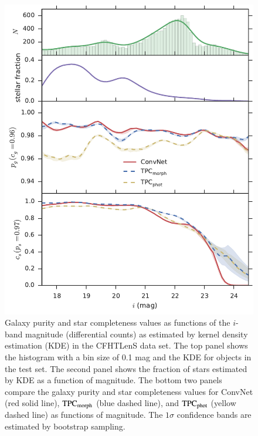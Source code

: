 \documentclass[fleqn,usenatbib]{mnras}
\begin{document}
\begin{figure}
  \centering
  \includegraphics[width=\columnwidth]{figures/clens_mag.pdf}
  \caption{Galaxy purity and star completeness values as functions
           of the $i$-band magnitude (differential counts)
           as estimated by kernel density estimation (KDE)
           in the CFHTLenS data set.
           The top panel shows the histogram with a bin size of 0.1 mag
           and the KDE for objects in the test set.
           The second panel shows the fraction of stars estimated by KDE
           as a function of magnitude.
           The bottom two panels compare the galaxy purity and star completeness
           values for ConvNet (red solid line),
           ${\mathrm{TPC}}_{{\mathrm{morph}}}$ (blue dashed line),
           and ${\mathrm{TPC}}_{{\mathrm{phot}}}$ (yellow dashed line)
           as functions of magnitude.
           The $1 \sigma$ confidence bands are estimated by
           bootstrap sampling.}
  \label{fig:clens_mag}
\end{figure}
\end{document}

